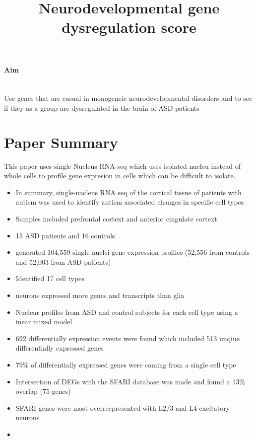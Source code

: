 \documentclass[12pt]{article}
\title{Neurodevelopmental gene dysregulation score}
\begin{document}
\maketitle

\paragraph{Aim}
~\\ Use genes that are casual in monogeneic neurodevelopmental disorders and to see if they as a group are dysregulated in the brain of ASD patients

\section{Paper Summary}
This paper uses single Nucleus RNA-seq which uses isolated nucleu instead of whole cells to profile gene expresion in cells which can be difficult to isolate. 
\begin{itemize}
    \item In summary, single-nucleus RNA seq of the cortical tissue of patients with autism was used to identify autism associated changes in specific cell types 
    \item Samples included prefrontal cortext and anterior cingulate cortext 
    \item 15 ASD patients and 16 controls 
    \item generated 104,559 single nuclei gene expression profiles (52,556 from controls and 52,003 from ASD patients)
    \item Identified 17 cell types 
    \item neurons expressed more genes and transcripts than glia 
    \item Nuclear profiles from ASD and control subjects for each cell type using a inear mixed model 
    \item 692 differentially expression events were found which included 513 unqiue differentially expressed genes 
    \item 79\% of differentially expressed genes were coming from a single cell type
    \item Intersection of DEGs with the SFARI database was made and found a 13\% overlap (75 genes)
    \item SFARI genes were most overreepresented with L2/3 and L4 excitatory neurons 
    \item 
    
\end{itemize}
\end{document}
